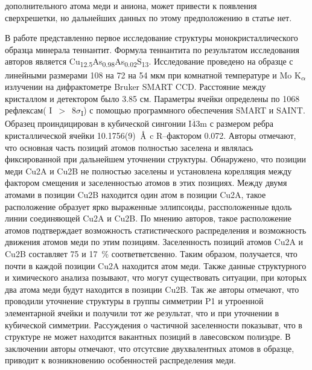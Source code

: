 дополнительного атома меди и аниона, может привести к появления сверхрешетки, но дальнейших данных по этому предположению в статье нет.


В работе \cite{Makovicky2005} представленно первое исследование структуры монокристаллического образца минерала теннантит. Формула теннантита по результатом исследования авторов является Cu\textsubscript{12.5}As\textsubscript{0.98}As\textsubscript{0.02}S\textsubscript{13}. Исследование проведено на образце с линейными размерами 108 на 72 на 54 мкм при комнатной температуре и Mo K\textsubscript{$\alpha$} излучении на дифрактометре Bruker SMART CCD. Расстояние между кристаллом и детектором было 3.85 см. Параметры ячейки определены по 1068 рефлексам( I~$>$~8$\sigma$\textsubscript{I}) с помощью программного обеспечения SMART и SAINT. Образец проиндицирован в кубической сингонии I$\overline{\!4}$3m с размером ребра кристаллической ячейки 10.1756(9)~$\mbox{\normalfont\AA}$ c R--фактором 0.072. Авторы отмечают, что основная часть позиций атомов полностью заселена и являлась фиксированной при дальнейшем уточнении структуры. Обнаружено, что позиции меди Cu2A и Cu2B не полностью заселены и установлена корелляция между фактором смещения и заселенностью атомов в этих позициях. Между двумя атомами в позиции Cu2B находится один атом в позиции Cu2A, такое расположение образует ярко выраженные эллипсоиды, рассположенные вдоль линии соединяющей Cu2A и Cu2B.  По мнению авторов, такое расположение атомов подтверждает возможность статистического распределения и возможность движения атомов меди  по этим позициям. Заселенность позиций атомов Cu2A и Cu2B составляет 75 и 17~\% соответветсвенно. Таким образом, получается, что почти в каждой позиции Cu2A находится атом меди. Также данные структурного и химического анализа позывают, что могут существовать ситуации, при которых два атома меди будут находится в позиции  Cu2B. Так же авторы отмечают, что проводили уточнение структуры в группы симметрии P1 и утроенной элементарной ячейки и получили тот же результат, что и при уточнении в кубической симметрии. Рассуждения о частичной заселенности показыват, что в структуре не может находится вакантных позиций в лавесовском полиэдре. В заключении авторы отмечают, что отсутсвие двухвалентных атомов в образце, приводит к возникновению особенностей распределения меди.
 


